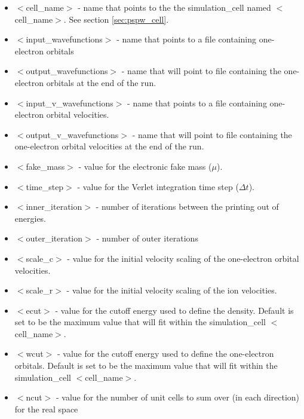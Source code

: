 \begin{itemize}
        \item $<$cell\_name$>$ - name that points to the
              the simulation\_cell named $<$cell\_name$>$.  See section \ref{sec:pspw_cell}.
        \item $<$input\_wavefunctions$>$ - name that points
              to a file containing one-electron orbitals
        \item $<$output\_wavefunctions$>$ - name that will
              point to file containing the one-electron orbitals at the
              end of the run. 
        \item $<$input\_v\_wavefunctions$>$ - name that points
              to a file containing one-electron orbital velocities.
        \item $<$output\_v\_wavefunctions$>$ - name that will
              point to file containing the one-electron orbital velocities
              at the end of the run. 
        \item $<$fake\_mass$>$ - value for the electronic
              fake mass ($\mu$).
        \item $<$time\_step$>$ - value for the Verlet integration 
               time step ($\Delta t$).
        \item $<$inner\_iteration$>$ - number of iterations between the
              printing out of energies.
        \item $<$outer\_iteration$>$ - number of outer iterations
        \item $<$scale\_c$>$ - value for the initial velocity
                              scaling of the one-electron orbital velocities.
        \item $<$scale\_r$>$ - value for the initial velocity
                              scaling of the ion velocities.
        \item $<$ecut$>$ - value for the cutoff energy used
                           to define the density.  Default is set
                           to be the maximum value that will fit
                           within the simulation\_cell $<$cell\_name$>$.
        \item $<$wcut$>$ - value for the cutoff energy used
                           to define the one-electron orbitals.  Default is set
                           to be the maximum value that will fit
                           within the simulation\_cell $<$cell\_name$>$.
        \item $<$ncut$>$ - value for the number of unit cells
                          to sum over (in each direction) for the real space

\end{itemize}
